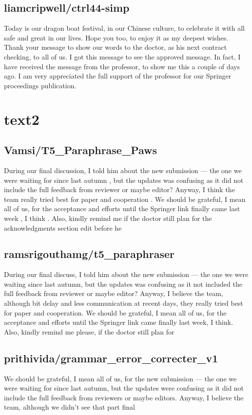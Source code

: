 \subsection*{liamcripwell/ctrl44-simp}
 Today is our dragon boat festival, in our Chinese culture, to celebrate it with all safe and great in our lives. Hope you too, to enjoy it as my deepest wishes. Thank your message to show our words to the doctor, as his next contract checking, to all of us. I got this message to see the approved message. In fact, I have received the message from the professor, to show me this a couple of days ago. I am very appreciated the full support of the professor for our Springer proceedings publication.

\section*{text2}
\subsection*{Vamsi/T5_Paraphrase_Paws}
During our final discussion, I told him about the new submission — the one we were waiting for since last autumn , but the updates was confusing as it did not include the full feedback from reviewer or maybe editor? Anyway, I think the team really tried best for paper and cooperation . We should be grateful, I mean all of us, for the acceptance and efforts until the Springer link finally came last week , I think . Also, kindly remind me if the doctor still plan for the acknowledgments section edit before he

\subsection*{ramsrigouthamg/t5_paraphraser}
During our final discuss, I told him about the new submission — the one we were waiting since last autumn, but the updates was confusing as it not included the full feedback from reviewer or maybe editor? Anyway, I believe the team, although bit delay and less communication at recent days, they really tried best for paper and cooperation. We should be grateful, I mean all of us, for the acceptance and efforts until the Springer link came finally last week, I think. Also, kindly remind me please, if the doctor still plan for

\subsection*{prithivida/grammar_error_correcter_v1}
We should be grateful, I mean all of us, for the new submission — the one we were waiting for since last autumn, but the updates were confusing as it did not include the full feedback from reviewers or maybe editors. Anyway, I believe the team, although we didn’t see that part final

